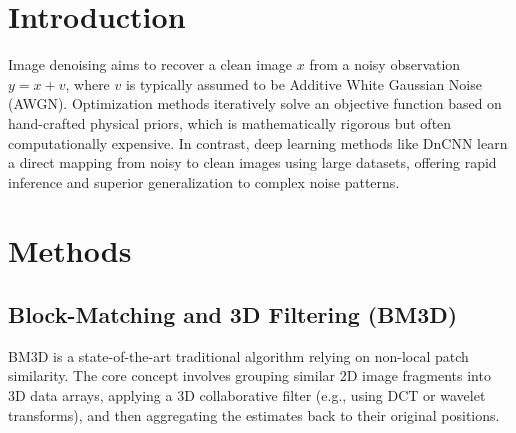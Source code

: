 




\begin{abstract}
This report provides a comparative analysis of five distinct image denoising algorithms: Block-Matching and 3D filtering (BM3D), three iterative optimization methods (ISTA, FISTA, ADMM) solving the Total Variation (TV) model, and a deep learning approach (DnCNN). Experiments demonstrate that DnCNN achieves the highest restoration quality while maintaining rapid inference speeds, significantly outperforming traditional optimization frameworks.
\end{abstract}

\section{Introduction}
Image denoising aims to recover a clean image $x$ from a noisy observation $y = x + v$, where $v$ is typically assumed to be Additive White Gaussian Noise (AWGN). Optimization methods iteratively solve an objective function based on hand-crafted physical priors, which is mathematically rigorous but often computationally expensive. In contrast, deep learning methods like DnCNN learn a direct mapping from noisy to clean images using large datasets, offering rapid inference and superior generalization to complex noise patterns.

\section{Methods}
\subsection{Block-Matching and 3D Filtering (BM3D)}
BM3D is a state-of-the-art traditional algorithm relying on non-local patch similarity. The core concept involves grouping similar 2D image fragments into 3D data arrays, applying a 3D collaborative filter (e.g., using DCT or wavelet transforms), and then aggregating the estimates back to their original positions.

